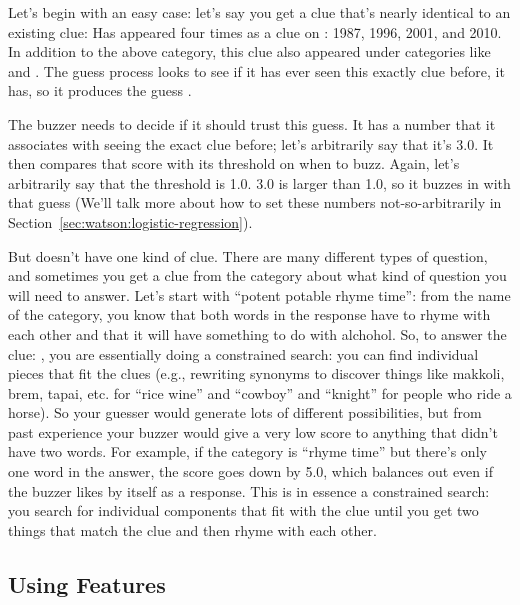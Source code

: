 Let's begin with an easy case: let's say you get a clue that's nearly
identical to an existing clue:
Has appeared four times as a clue on \jeopardy{}: 1987, 1996, 2001, and 2010.
%
In addition to the above category, this clue also appeared under categories like  and .
%
The guess process looks to see if it has ever seen this exactly clue before,
it has, so it produces the guess .

The buzzer needs to decide if it should trust this guess.
%
It has a number that it associates with seeing the exact clue before; let's
arbitrarily say that it's 3.0.  It then compares that score with its threshold
on when to buzz.  Again, let's arbitrarily say that the threshold is 1.0.  3.0
is larger than 1.0, so it buzzes in with that guess (We'll talk more about how to set these numbers not-so-arbitrarily in
Section~\ref{sec:watson:logistic-regression}).

But \jeopardy{} doesn’t have one kind of clue.  There are many different types
of question, and sometimes you get a clue from the category about what kind of
question you will need to answer.  Let’s start with ``potent potable rhyme
time'': from the name of the category, you know that both words in the
response have to rhyme with each other and that it will have something to do
with alchohol.
%
So, to answer the clue:
,
%
you are essentially doing a constrained search: you can find individual pieces
that fit the clues (e.g., rewriting synonyms to discover things like makkoli,
brem, tapai, etc. for ``rice wine'' and ``cowboy'' and ``knight'' for people
who ride a horse).
%
So your guesser would generate lots of different possibilities, but from past
experience your buzzer would give a very low score to anything that didn't
have two words.
%
For example, if the category is ``rhyme time'' but there's only one word in
the answer, the score goes down by 5.0, which balances out even if the buzzer
likes  by itself as a response.
%
This is in essence a
constrained search: you search for individual components that fit with the
clue until you get two things that match the clue and then rhyme with each
other.

\subsection{Using Features}
\label{sec:watson:features}

